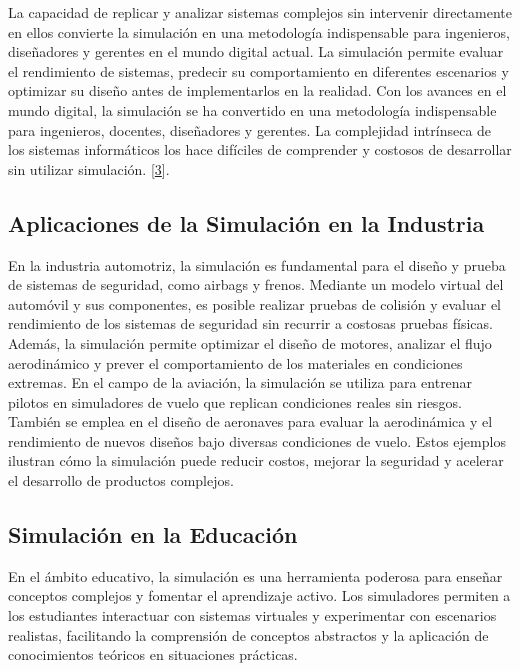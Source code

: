 \documentclass[12pt,twoside]{templates/unerthesis}
\begin{document}
La capacidad de replicar y analizar sistemas complejos sin intervenir directamente en ellos convierte la simulación en una metodología indispensable para ingenieros, diseñadores y gerentes en el mundo digital actual. La simulación permite evaluar el rendimiento de sistemas, predecir su comportamiento en diferentes escenarios y optimizar su diseño antes de implementarlos en la realidad. Con los avances en el mundo digital, la simulación se ha convertido en una metodología indispensable para ingenieros, docentes, diseñadores y gerentes. La complejidad intrínseca de los sistemas informáticos los hace difíciles de comprender y costosos de desarrollar sin utilizar simulación. {[}\protect\hyperlink{ref-law_simulation_2015}{3}{]}.

\hypertarget{aplicaciones-de-la-simulaciuxf3n-en-la-industria}{%
\subsection{Aplicaciones de la Simulación en la Industria}\label{aplicaciones-de-la-simulaciuxf3n-en-la-industria}}

En la industria automotriz, la simulación es fundamental para el diseño y prueba de sistemas de seguridad, como airbags y frenos. Mediante un modelo virtual del automóvil y sus componentes, es posible realizar pruebas de colisión y evaluar el rendimiento de los sistemas de seguridad sin recurrir a costosas pruebas físicas. Además, la simulación permite optimizar el diseño de motores, analizar el flujo aerodinámico y prever el comportamiento de los materiales en condiciones extremas. En el campo de la aviación, la simulación se utiliza para entrenar pilotos en simuladores de vuelo que replican condiciones reales sin riesgos. También se emplea en el diseño de aeronaves para evaluar la aerodinámica y el rendimiento de nuevos diseños bajo diversas condiciones de vuelo. Estos ejemplos ilustran cómo la simulación puede reducir costos, mejorar la seguridad y acelerar el desarrollo de productos complejos.

\hypertarget{simulaciuxf3n-en-la-educaciuxf3n}{%
\subsection{Simulación en la Educación}\label{simulaciuxf3n-en-la-educaciuxf3n}}

En el ámbito educativo, la simulación es una herramienta poderosa para enseñar conceptos complejos y fomentar el aprendizaje activo. Los simuladores permiten a los estudiantes interactuar con sistemas virtuales y experimentar con escenarios realistas, facilitando la comprensión de conceptos abstractos y la aplicación de conocimientos teóricos en situaciones prácticas.
\end{document}
